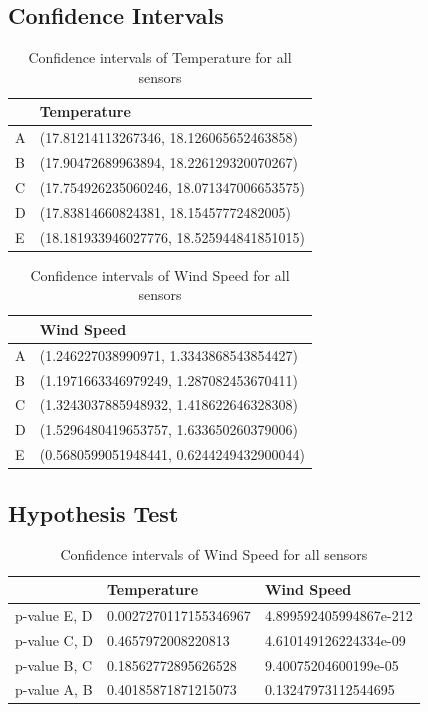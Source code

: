 \documentclass{article}
\begin{document}
    \subsection{Confidence Intervals}
        \begin{table}[]
            \caption {Confidence intervals of Temperature for all sensors}
            \begin{tabular}{ll}
            & Temperature                              \\ \hline
            A & (17.81214113267346, 18.126065652463858)  \\
            B & (17.90472689963894, 18.226129320070267)  \\
            C & (17.754926235060246, 18.071347006653575) \\
            D & (17.83814660824381, 18.15457772482005)   \\
            E & (18.181933946027776, 18.525944841851015)
            \end{tabular}
            \end{table}

        \begin{table}[]
            \caption {Confidence intervals of Wind Speed for all sensors}
            \begin{tabular}{ll}
            & Wind Speed                               \\ \hline
            A & (1.246227038990971, 1.3343868543854427)  \\
            B & (1.1971663346979249, 1.287082453670411)  \\
            C & (1.3243037885948932, 1.418622646328308)  \\
            D & (1.5296480419653757, 1.633650260379006)  \\
            E & (0.5680599051948441, 0.6244249432900044)
            \end{tabular}
            \end{table}

    \subsection{Hypothesis Test}
        \begin{table}[]
            \caption {Confidence intervals of Wind Speed for all sensors}
            \begin{tabular}{lll}
                        & Temperature             & Wind Speed  \\ \hline
            p-value E, D & 0.0027270117155346967 & 4.899592405994867e-212  \\ 
            p-value C, D & 0.4657972008220813 & 4.610149126224334e-09  \\
            p-value B, C & 0.18562772895626528 & 9.40075204600199e-05  \\
            p-value A, B & 0.40185871871215073 & 0.13247973112544695 
            \end{tabular}
        \end{table}
\end{document}
